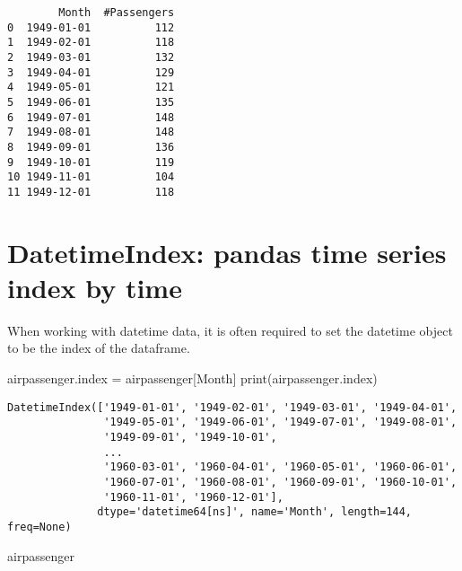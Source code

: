 \documentclass[
  letterpaper,
  DIV=11,
  numbers=noendperiod]{scrreprt}
\newenvironment{Shaded}{\begin{snugshade}}{\end{snugshade}}
\newcommand{\BuiltInTok}[1]{\textcolor[rgb]{0.00,0.23,0.31}{#1}}
\newcommand{\NormalTok}[1]{\textcolor[rgb]{0.00,0.23,0.31}{#1}}
\newcommand{\OperatorTok}[1]{\textcolor[rgb]{0.37,0.37,0.37}{#1}}
\newcommand{\StringTok}[1]{\textcolor[rgb]{0.13,0.47,0.30}{#1}}
\begin{document}
\begin{verbatim}
        Month  #Passengers
0  1949-01-01          112
1  1949-02-01          118
2  1949-03-01          132
3  1949-04-01          129
4  1949-05-01          121
5  1949-06-01          135
6  1949-07-01          148
7  1949-08-01          148
8  1949-09-01          136
9  1949-10-01          119
10 1949-11-01          104
11 1949-12-01          118
\end{verbatim}

\hypertarget{datetimeindex-pandas-time-series-index-by-time}{%
\section{DatetimeIndex: pandas time series index by
time}\label{datetimeindex-pandas-time-series-index-by-time}}

When working with datetime data, it is often required to set the
datetime object to be the index of the dataframe.

\begin{Shaded}
\begin{Highlighting}[]
\NormalTok{airpassenger.index }\OperatorTok{=}\NormalTok{ airpassenger[}\StringTok{\textquotesingle{}Month\textquotesingle{}}\NormalTok{]}
\BuiltInTok{print}\NormalTok{(airpassenger.index)}
\end{Highlighting}
\end{Shaded}

\begin{verbatim}
DatetimeIndex(['1949-01-01', '1949-02-01', '1949-03-01', '1949-04-01',
               '1949-05-01', '1949-06-01', '1949-07-01', '1949-08-01',
               '1949-09-01', '1949-10-01',
               ...
               '1960-03-01', '1960-04-01', '1960-05-01', '1960-06-01',
               '1960-07-01', '1960-08-01', '1960-09-01', '1960-10-01',
               '1960-11-01', '1960-12-01'],
              dtype='datetime64[ns]', name='Month', length=144, freq=None)
\end{verbatim}

\begin{Shaded}
\begin{Highlighting}[]
\NormalTok{airpassenger}
\end{Highlighting}
\end{Shaded}
\end{document}
